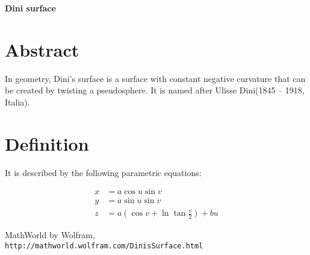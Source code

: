\documentclass[12pt,dvipdfmx]{article}
\begin{document}
\begin{center}

{\bf \Large Dini surface}

\end{center}


\section{Abstract}
In geometry, Dini's surface is a surface with constant negative curvature that can be created by twisting a pseudosphere. It is named after Ulisse Dini(1845 – 1918, Italia).

\section{Definition}
It is described by the following parametric equations:

\[
\begin{aligned}
x&=a\cos u\sin v \\
y&=a\sin u\sin v \\
z&=a\left(\cos v+\ln \tan {\frac {v}{2}}\right)+bu
\end{aligned}
\]
\begin{thebibliography}{9}

 MathWorld by Wolfram, \\
 \verb|http://mathworld.wolfram.com/DinisSurface.html|


\end{thebibliography}
\end{document}
